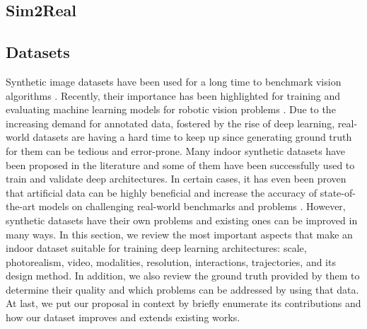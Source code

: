 \subsection{Sim2Real}

\subsection{Datasets}

Synthetic image datasets have been used for a long time to benchmark vision algorithms \cite{Butler2012}. Recently, their importance has been highlighted for training and evaluating machine learning models for robotic vision problems \cite{Brodeur2017, Ros2016, Mahler2017dex}. Due to the increasing demand for annotated data, fostered by the rise of deep learning, real-world datasets are having a hard time to keep up since generating ground truth for them can be tedious and error-prone. Many indoor synthetic datasets have been proposed in the literature and some of them have been successfully used to train and validate deep architectures. In certain cases, it has even been proven that artificial data can be highly beneficial and increase the accuracy of state-of-the-art models on challenging real-world benchmarks and problems \cite{Shrivastava2017,Barbosa2018, Ros2016}. However, synthetic datasets have their own problems and existing ones can be improved in many ways. In this section, we review the most important aspects that make an indoor dataset suitable for training deep learning architectures: scale, photorealism, video, modalities, resolution, interactions, trajectories, and its design method. In addition, we also review the ground truth provided by them to determine their quality and which problems can be addressed by using that data. At last, we put our proposal in context by briefly enumerate its contributions and how our dataset improves and extends existing works.


